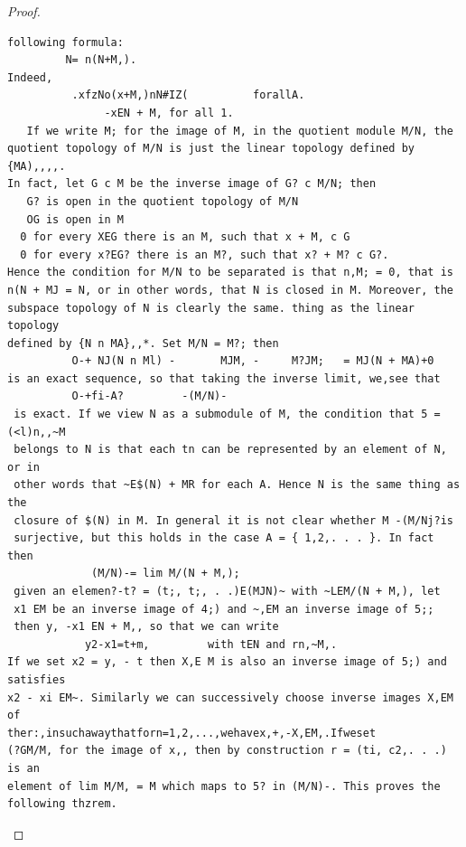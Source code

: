 \begin{proof}
\begin{verbatim}
following formula:
         N= n(N+M,).
Indeed,
          .xfzNo(x+M,)nN#IZ(          forallA.
               -xEN + M, for all 1.
   If we write M; for the image of M, in the quotient module M/N, the
quotient topology of M/N is just the linear topology defined by {MA),,,,.
In fact, let G c M be the inverse image of G? c M/N; then
   G? is open in the quotient topology of M/N
   OG is open in M
  0 for every XEG there is an M, such that x + M, c G
  0 for every x?EG? there is an M?, such that x? + M? c G?.
Hence the condition for M/N to be separated is that n,M; = 0, that is
n(N + MJ = N, or in other words, that N is closed in M. Moreover, the
subspace topology of N is clearly the same. thing as the linear topology
defined by {N n MA},,*. Set M/N = M?; then
          O-+ NJ(N n Ml) -       MJM, -     M?JM;   = MJ(N + MA)+0
is an exact sequence, so that taking the inverse limit, we,see that
          O-+fi-A?         -(M/N)-
 is exact. If we view N as a submodule of M, the condition that 5 = (<l)n,,~M
 belongs to N is that each tn can be represented by an element of N, or in
 other words that ~E$(N) + MR for each A. Hence N is the same thing as the
 closure of $(N) in M. In general it is not clear whether M -(M/Nj?is
 surjective, but this holds in the case A = { 1,2,. . . }. In fact then
             (M/N)-= lim M/(N + M,);
 given an elemen?-t? = (t;, t;, . .)E(MJN)~ with ~LEM/(N + M,), let
 x1 EM be an inverse image of 4;) and ~,EM an inverse image of 5;;
 then y, -x1 EN + M,, so that we can write
            y2-x1=t+m,         with tEN and rn,~M,.
If we set x2 = y, - t then X,E M is also an inverse image of 5;) and satisfies
x2 - xi EM~. Similarly we can successively choose inverse images X,EM of
ther:,insuchawaythatforn=1,2,...,wehavex,+,-X,EM,.Ifweset
(?GM/M, for the image of x,, then by construction r = (ti, c2,. . .) is an
element of lim M/M, = M which maps to 5? in (M/N)-. This proves the
following thzrem.
\end{verbatim}
\end{proof}


